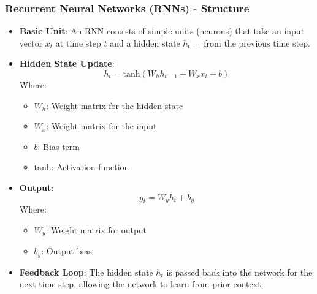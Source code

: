 \documentclass[aspectratio=169]{beamer}
\begin{document}
\begin{frame}[fragile]
    \frametitle{Recurrent Neural Networks (RNNs) - Structure}
    \begin{itemize}
        \item \textbf{Basic Unit}: An RNN consists of simple units (neurons) that take an input vector \( x_t \) at time step \( t \) and a hidden state \( h_{t-1} \) from the previous time step.
        
        \item \textbf{Hidden State Update}:
        \begin{equation}
            h_t = \text{tanh}(W_h h_{t-1} + W_x x_t + b)
        \end{equation}
        Where:
        \begin{itemize}
            \item \( W_h \): Weight matrix for the hidden state
            \item \( W_x \): Weight matrix for the input
            \item \( b \): Bias term
            \item \( \text{tanh} \): Activation function
        \end{itemize}
        
        \item \textbf{Output}:
        \begin{equation}
            y_t = W_y h_t + b_y
        \end{equation}
        Where:
        \begin{itemize}
            \item \( W_y \): Weight matrix for output
            \item \( b_y \): Output bias
        \end{itemize}
        
        \item \textbf{Feedback Loop}: The hidden state \( h_t \) is passed back into the network for the next time step, allowing the network to learn from prior context.
    \end{itemize}
\end{frame}
\end{document}
